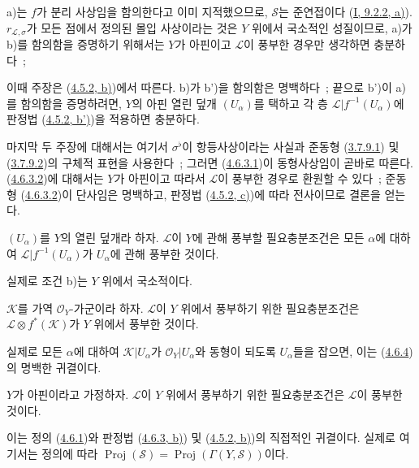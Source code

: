 a)는 $f$가 분리 사상임을 함의한다고 이미 지적했으므로,
$\mathcal{S}$는 준연접이다
(\hyperref[I.9.2.2-ko]{I, 9.2.2, a)}). $r_{\mathcal{L},\sigma}$가
모든 점에서 정의된 몰입 사상이라는 것은 $Y$ 위에서 국소적인
성질이므로, a)가 b)를 함의함을 증명하기 위해서는 $Y$가 아핀이고
$\mathcal{L}$이 풍부한 경우만 생각하면 충분하다~;


이때 주장은 (\hyperref[II.4.5.2-ko]{4.5.2, b)})에서 따른다. b)가
b')을 함의함은 명백하다~; 끝으로 b')이 a)를 함의함을 증명하려면,
$Y$의 아핀 열린 덮개 $(U_\alpha)$를 택하고 각 층
$\mathcal{L}|f^{-1}(U_\alpha)$에 판정법
(\hyperref[II.4.5.2-ko]{4.5.2, b')})을 적용하면 충분하다.

마지막 두 주장에 대해서는 여기서 $\sigma^\flat$이 항등사상이라는
사실과 준동형
(\hyperref[II.3.7.9.1-ko]{3.7.9.1}) 및
(\hyperref[II.3.7.9.2-ko]{3.7.9.2})의 구체적 표현을 사용한다~;
그러면 (\hyperref[II.4.6.3.1-ko]{4.6.3.1})이 동형사상임이 곧바로
따른다. (\hyperref[II.4.6.3.2-ko]{4.6.3.2})에 대해서는 $Y$가
아핀이고 따라서 $\mathcal{L}$이 풍부한 경우로 환원할 수 있다~;
준동형 (\hyperref[II.4.6.3.2-ko]{4.6.3.2})이 단사임은 명백하고,
판정법 (\hyperref[II.4.5.2-ko]{4.5.2, c)})에 따라 전사이므로 결론을
얻는다.

\begin{corollary}[4.6.4]
\label{II.4.6.4-ko}
$(U_\alpha)$를 $Y$의 열린 덮개라 하자. $\mathcal{L}$이 $Y$에 관해
풍부할 필요충분조건은 모든 $\alpha$에 대하여
$\mathcal{L}|f^{-1}(U_\alpha)$가 $U_\alpha$에 관해 풍부한 것이다.
\end{corollary}

실제로 조건 b)는 $Y$ 위에서 국소적이다.

\begin{corollary}[4.6.5]
\label{II.4.6.5-ko}
$\mathcal{K}$를 가역 $\mathcal{O}_Y$-가군이라 하자.
$\mathcal{L}$이 $Y$ 위에서 풍부하기 위한 필요충분조건은
$\mathcal{L}\otimes f^*(\mathcal{K})$가 $Y$ 위에서 풍부한 것이다.
\end{corollary}

실제로 모든 $\alpha$에 대하여 $\mathcal{K}|U_\alpha$가
$\mathcal{O}_Y|U_\alpha$와 동형이 되도록 $U_\alpha$들을 잡으면, 이는
(\hyperref[II.4.6.4-ko]{4.6.4})의 명백한 귀결이다.

\begin{corollary}[4.6.6]
\label{II.4.6.6-ko}
$Y$가 아핀이라고 가정하자. $\mathcal{L}$이 $Y$ 위에서 풍부하기 위한
필요충분조건은 $\mathcal{L}$이 풍부한 것이다.
\end{corollary}

이는 정의 (\hyperref[II.4.6.1-ko]{4.6.1})와 판정법
(\hyperref[II.4.6.3-ko]{4.6.3, b)}) 및
(\hyperref[II.4.5.2-ko]{4.5.2, b)})의 직접적인 귀결이다. 실제로 여기서는
정의에 따라
$\operatorname{Proj}(\mathcal{S})
=\operatorname{Proj}(\Gamma(Y,\mathcal{S}))$이다.

